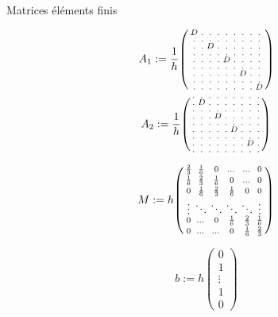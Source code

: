 \documentclass[10pt]{beamer}
\begin{document}
\begin{frame}{Matrices éléments finis}
\begin{minipage}{.35\textwidth}
$$
A_{1} := \frac{1}{h}
\begin{psmallmatrix}
D & . & . & . & . & . & . & . & .\\
. & . & . & . & . & . & . & . & .\\
. & . & D & . & . & . & . & . & .\\
. & . & . & . & . & . & . & . & .\\
. & . & . & . & D & . & . & . & .\\
. & . & . & . & . & . & . & . & .\\
. & . & . & . & . & . & D & . & .\\
. & . & . & . & . & . & . & . & .\\
. & . & . & . & . & . & . & . & D
\end{psmallmatrix} 
$$
$$
A_{2} := \frac{1}{h}
\begin{psmallmatrix}
. & . & . & . & . & . & . & . & .\\
. & D & . & . & . & . & . & . & .\\
. & . & . & . & . & . & . & . & .\\
. & . & . & D & . & . & . & . & .\\
. & . & . & . & . & . & . & . & .\\
. & . & . & . & . & D & . & . & .\\
. & . & . & . & . & . & . & . & .\\
. & . & . & . & . & . & . & D & .\\
. & . & . & . & . & . & . & . & .
\end{psmallmatrix} 
$$
\end{minipage}%
\hfill
\begin{minipage}{.65\textwidth}%
$$
M:= h\begin{psmallmatrix}
\frac{2}{3} &  \frac{1}{6} & 0 &\dots & \dots &0   \\
\frac{1}{6} & \frac{2}{3} & \frac{1}{6} &0 & \dots &0   \\
 0 & \frac{1}{6} & \frac{2}{3} & \frac{1}{6} & 0 & 0    \\
\vdots  &  \ddots & \ddots  & \ddots & \ddots & \vdots \\
0  & \dots & 0  &\frac{1}{6} & \frac{2}{3} &\frac{1}{6} \\
0  &  \dots & \dots   &0 & \frac{1}{6} & \frac{2}{3}
\end{psmallmatrix} 
$$

$$
b := h
\begin{pmatrix}
0\\
1 \\
\vdots \\
1 \\
0
\end{pmatrix}
$$
\end{minipage}%



\end{frame}
\end{document}
